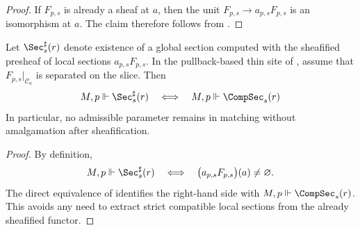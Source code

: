 \begin{proof}
If $F_{p,s}$ is already a sheaf at $a$, then the unit $F_{p,s}\to a_{p,s}F_{p,s}$ is an isomorphism at $a$. The claim therefore follows from .
\end{proof}

\begin{corollary}\label{cor:sheafification-removes-glue}
Let $\Sec_s^{\sharp}(r)$ denote existence of a global section computed with the
sheafified presheaf of local sections $a_{p,s}F_{p,s}$. In the pullback-based
thin site of , assume that
$F_{p,s}|_{\mathcal C_a}$ is separated on the slice. Then
\[
M,p\Vdash \Sec_s^{\sharp}(r)
\quad\Longleftrightarrow\quad
M,p\Vdash \CompSec_s(r)
\]
In particular, no admissible parameter remains in matching without amalgamation after sheafification.
\end{corollary}

\begin{proof}
By definition,
\[
M,p\Vdash \Sec_s^{\sharp}(r)
\quad\Longleftrightarrow\quad
\bigl(a_{p,s}F_{p,s}\bigr)(a)\neq\varnothing .
\]
The direct equivalence of
 identifies the right-hand side
with \(M,p\Vdash\CompSec_s(r)\). This avoids any need to extract strict
compatible local sections from the already sheafified functor.
\end{proof}




